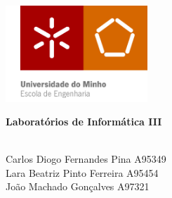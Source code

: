 \documentclass[11pt]{article}
\begin{document}
\begin{titlepage}
    \begin{center}
        \includegraphics[width=0.4\textwidth]{Imagens/uni.png}
    
        \vspace{2cm}
        
        \textbf{\Huge Laboratórios de Informática III}\par

        \vspace{3cm}
        
        \large \\
        
        Carlos Diogo Fernandes Pina A95349 \\
        Lara Beatriz Pinto Ferreira A95454 \\ 
        João Machado Gonçalves A97321 \\

        \vspace{2cm}
    

\end{center}
\end{titlepage}
\end{document}
